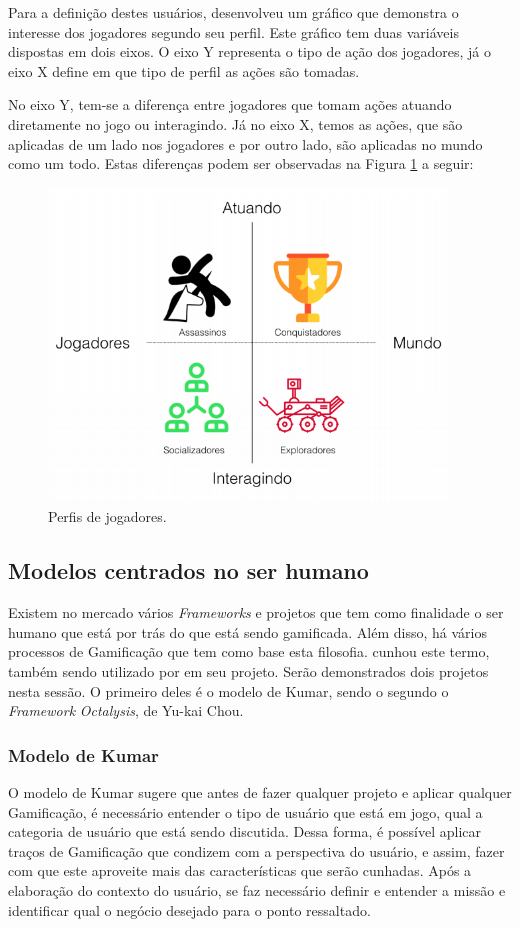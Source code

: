 Para a definição destes usuários, \cite{bartle1996hearts} desenvolveu um gráfico que demonstra o
interesse dos jogadores segundo seu perfil. Este gráfico tem duas variáveis dispostas
em dois eixos. O eixo Y representa o tipo de ação dos jogadores, já o eixo X define
em que tipo de perfil as ações são tomadas.

No eixo Y, tem-se a diferença entre jogadores
que tomam ações atuando diretamente no jogo ou interagindo. Já no eixo X, temos as ações,
que são aplicadas de um lado nos jogadores e por outro lado, são aplicadas no mundo como
um todo. Estas diferenças podem ser observadas na Figura \ref{fig:perfiljogadores} a seguir:

\begin{figure}[h]
    \centering
    \includegraphics[width=400px, scale=1]{figuras/perfiljogadores}
    \caption{Perfis de jogadores.}
    \label{fig:perfiljogadores}
\end{figure}


\subsection{Modelos centrados no ser humano}
\label{sub:modelosnoserhumano}
Existem no mercado vários \textit{Frameworks} e projetos que tem como finalidade o ser
humano que está por trás do que está sendo gamificada. Além disso, há
vários processos de Gamificação que tem como base esta filosofia. 
\cite{kumar2013gamification}
cunhou este termo, também sendo utilizado por \cite{chou2015actionable} em seu projeto.
Serão demonstrados dois projetos nesta sessão. O primeiro
deles é o modelo de Kumar, sendo o segundo o \textit{Framework} \textit{Octalysis}, de Yu-kai Chou.

\subsubsection{Modelo de Kumar}
\label{sub:modelodekumar}
O modelo de Kumar sugere que antes de fazer qualquer projeto e aplicar qualquer Gamificação,
é necessário entender o tipo de usuário que está em jogo, qual a categoria de usuário
que está sendo discutida. Dessa forma, é possível aplicar traços de Gamificação
que condizem com a perspectiva do usuário, e assim, fazer com que este aproveite
mais das características que serão cunhadas. Após a elaboração do contexto do
usuário, se faz necessário definir e entender a missão e identificar qual o negócio
desejado para o ponto ressaltado.

